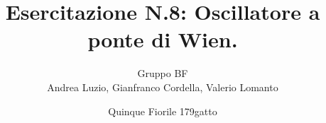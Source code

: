 \documentclass[a4paper,11pt]{article}
\author{Gruppo BF \\ Andrea Luzio, Gianfranco Cordella, Valerio Lomanto}
\title{Esercitazione N.8: Oscillatore a ponte di Wien.}
\date{Quinque Fiorile 179gatto}
\newcommand{\insertpart}[2]{}
\begin{document}
\maketitle

\insertpart{parte1}{}

\insertpart{parte2}{}

\insertpart{parte3}{}
\end{document}
